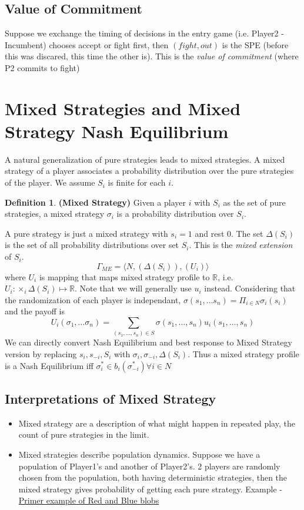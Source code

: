 \documentclass{article}
\theoremstyle{definition}
\newtheorem{defn}{Definition}[section]
\begin{document}
\subsection{Value of Commitment}
Suppose we exchange the timing of decisions in the entry game (i.e. Player2 - Incumbent) chooses accept or fight first, then $(fight, out)$ is the SPE (before this was discared, this time the other is). This is the \textit{value of commitment} (where P2 commits to fight)
\section{Mixed Strategies and Mixed Strategy Nash Equilibrium}
A natural generalization of pure strategies leads to mixed strategies. A mixed strategy of a player associates a probability distribution over the pure strategies of the player. We assume $S_i$ is finite for each $i$.
\begin{defn}
\textbf{(Mixed Strategy)} Given a player $i$ with $S_i$ as the set of pure strategies, a mixed strategy $\sigma_i$ is a probability distribution over $S_i$.
\end{defn}
A pure strategy is just a mixed strategy with $s_i =1$ and rest $0$. The set $\Delta (S_i)$ is the set of all probability distributions over set $S_i$. This is the \textit{mixed extension} of $S_i$. $$\Gamma_{ME} = \langle N, (\Delta(S_i)), (U_i) \rangle$$ where $U_i$ is mapping that maps mixed strategy profile to $\mathbb{R}$, i.e. $U_i: \times_i \Delta(S_i) \mapsto \mathbb{R}$. Note that we will generally use $u_i$ instead. Considering that the randomization of each player is independant, $\sigma(s_1,\dots s_n) = \Pi_{i\in N} \sigma_i(s_i)$ and the payoff is $$U_i(\sigma_1, \dots \sigma_n) = \sum_{(s_1,\dots,s_n)\in S} \sigma(s_1,\dots,s_n) u_i(s_1,\dots,s_n)$$
We can directly convert Nash Equilibrium and best response to Mixed Strategy version by replacing $s_i, s_{-i}, S_i$ with $\sigma_i, \sigma_{-i}, \Delta(S_i)$. Thus a mixed strategy profile is a Nash Equilibrium iff $\sigma_i^* \in b_i(\sigma_{-i}^*) \forall i\in N$
\subsection{Interpretations of Mixed Strategy}
\begin{itemize}
	\item Mixed strategy are a description of what might happen in repeated play, the count of pure strategies in the limit.
	\item Mixed strategies describe population dynamics. Suppose we have a population of Player1's and another of Player2's. 2 players are randomly chosen from the population, both having deterministic strategies, then the mixed strategy gives probability of getting each pure strategy. Example - \href{https://www.youtube.com/watch?v=YNMkADpvO4w&t=7s}{Primer example of Red and Blue blobs}
\end{itemize}
\end{document}
